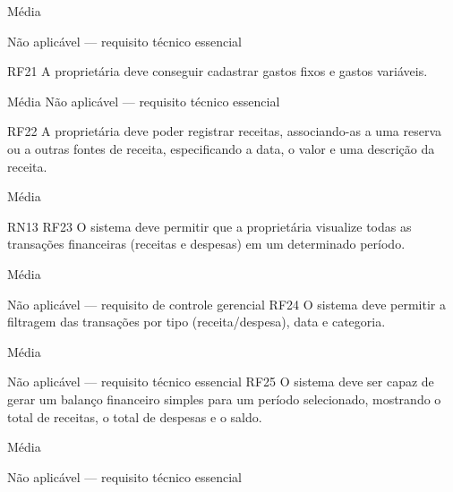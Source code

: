 Média
	







Não aplicável — requisito técnico essencial


	RF21
	A proprietária deve conseguir cadastrar gastos fixos e gastos variáveis.
	

Média
	Não aplicável — requisito técnico essencial


	RF22
	A proprietária deve poder registrar receitas, associando-as a uma reserva ou a outras fontes de receita, especificando a data, o valor e uma descrição da receita.
	







Média
	







RN13 
	RF23
	O sistema deve permitir que a proprietária visualize todas as transações financeiras (receitas e despesas) em um determinado período.
	





Média
	



Não aplicável — requisito de controle gerencial
	RF24
	O sistema deve permitir a filtragem das transações por tipo (receita/despesa), data e categoria.
	



Média
	

Não aplicável — requisito técnico essencial
	RF25
	O sistema deve ser capaz de gerar um balanço financeiro simples para um período selecionado, mostrando o total de receitas, o total de despesas e o saldo.
	





Média
	





Não aplicável — requisito técnico essencial
	

